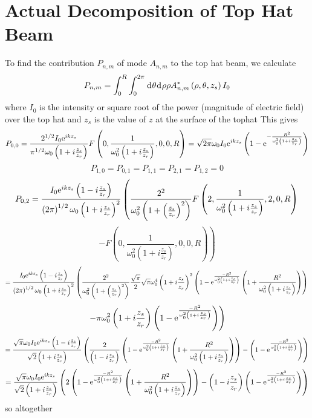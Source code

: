 \documentclass[11pt]{amsart}
\makeatletter
\newcommand{\e}{{\rm e}}				%
\newcommand{\msp}[1]{\mspace{#1mu}}		%
\newcommand{\0}{\varnothing}		%
\newcommand{\dd}{\msp{1} {\rm{d}} \msp{1}}	%
\newcommand{\1}{!}
\newcommand{\2}{@}
\newcommand{\3}{\#}
\newcommand{\4}{\$}
\newcommand{\5}{\%}
\newcommand{\6}{$^\wedge$}
\newcommand{\7}{\&}
\newcommand{\8}{*}
\newcommand{\9}{(}
\makeatother
\begin{document}
\section{Actual Decomposition of Top Hat Beam}
\noindent To find the contribution $P_{n,m}$ of mode $A_{n,m}$ to the top hat beam, we calculate
\[
P_{n,m} = \int_0^R\int_0^{2\pi}\dd \theta\dd  \rho \rho A_{n,m}^*\left(\rho,\theta,z_s\right)I_0
\]
where $I_0$ is the intensity or square root of the power (magnitude of electric field) over the top hat and $z_s$ is the value of $z$ at the surface of the tophat
This gives
\[
P_{0,0} = \frac{2^{1/2}I_0\e^{ikz_s}}{\pi^{1/2}\omega_0\left(1+i\frac{z_s}{z_r}\right)}F\left(0,\frac{1}{\omega_0^2\left(1+i\frac{z_s}{z_r}\right)},0,0,R\right) = \sqrt{2\pi}\omega_0I_0\e^{ikz_s}\left(1-\e^{-\frac{R^2}{\omega_0^2\left(1+i\frac{z_s}{z_r}\right)}}\right)
\]
\[
P_{1,0} = P_{0,1} = P_{1,1} = P_{2,1} = P_{1,2} = 0
\]
\[
P_{0,2} = \frac{I_0\e^{ikz_s}\left(1-i\frac{z_s}{z_r}\right)}{\left(2\pi\right)^{1/2}\omega_0\left(1+i\frac{z_s}{z_r}\right)^2}\left(\frac{2^2}{\omega_0^2\left(1+\left(\frac{z_s}{z_r}\right)^2\right)}F\left(2,\frac{1}{\omega_0^2\left(1+i\frac{z_s}{z_r}\right)},2,0,R\right)\right.\]\[\left.-F\left(0,\frac{1}{\omega_0^2\left(1+i\frac{z_s}{z_r}\right)},0,0,R\right)\right)
\]
\[
= \frac{I_0\e^{ikz_s}\left(1-i\frac{z_s}{z_r}\right)}{\left(2\pi\right)^{1/2}\omega_0\left(1+i\frac{z_s}{z_r}\right)^2}\left(\frac{2^2}{\omega_0^2\left(1+\left(\frac{z_s}{z_r}\right)^2\right)}\frac{\sqrt{\pi}}{2}\sqrt{\pi}\omega_0^4\left(1+i\frac{z_s}{z_r}\right)^2\left(1-
\e^{\frac{-R^2}{\omega_0^2\left(1+i\frac{z_s}{z_r}\right)}}\left(1+\frac{R^2}{\omega_0^2\left(1+i\frac{z_s}{z_r}\right)}\right)\right)\right.\]\[\left.-\pi\omega_0^2\left(1+i\frac{z_s}{z_r}\right)\left(1-\e^{\frac{-R^2}{\omega_0^2\left(1+i\frac{z_s}{z_r}\right)}}\right)\right)
\]
\[
=\frac{\sqrt{\pi}\omega_0I_0\e^{ikz_s}\left(1-i\frac{z_s}{z_r}\right)}{\sqrt{2}\left(1+i\frac{z_s}{z_r}\right)}\left(\frac{2}{\left(1-i\frac{z_s}{z_r}\right)}\left(1-\e^{\frac{-R^2}{\omega_0^2\left(1+i\frac{z_s}{z_r}\right)}}\left(1+\frac{R^2}{\omega_0^2\left(1+i\frac{z_s}{z_r}\right)}\right)\right) - \left(1-\e^{\frac{-R^2}{\omega_0^2\left(1+i\frac{z_s}{z_r}\right)}}\right)\right)
\]
\[
=\frac{\sqrt{\pi}\omega_0I_0\e^{ikz_s}}{\sqrt{2}\left(1+i\frac{z_s}{z_r}\right)}\left(2\left(1-\e^{\frac{-R^2}{\omega_0^2\left(1+i\frac{z_s}{z_r}\right)}}\left(1+\frac{R^2}{\omega_0^2\left(1+i\frac{z_s}{z_r}\right)}\right)\right) - \left(1-i\frac{z_s}{z_r}\right)\left(1-\e^{\frac{-R^2}{\omega_0^2\left(1+i\frac{z_s}{z_r}\right)}}\right)\right)
\]
so altogether
\end{document}
